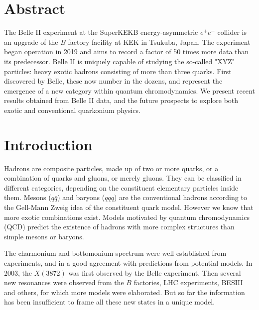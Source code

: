 \documentclass[border=2mm]{article}
\begin{document}
\section*{Abstract}
The Belle II experiment at the SuperKEKB energy-asymmetric $e^{+}e^{-}$ collider is an upgrade of the $B$ factory facility at KEK in Tsukuba, Japan. The experiment began operation in 2019  and aims to record a factor of 50 times more data than its predecessor. Belle II is uniquely capable of studying the so-called "XYZ" particles: heavy exotic hadrons consisting of more
than three quarks. First discovered by Belle, these now number in the dozens, and represent the emergence of a new category within quantum chromodynamics. We present recent results
obtained from Belle II data, and the future prospects to explore both exotic and conventional quarkonium physics.
  



\section{Introduction}
\label{sec:intro}
Hadrons are composite particles, made up of two or more quarks, or a combination of quarks and gluons, or merely gluons. They can be classified in different categories, depending on the constituent elementary particles inside them. Mesons ($q\bar{q}$) and baryons ($qqq$) are the conventional hadrons according to the Gell-Mann Zweig idea of the constituent quark model.
However we know that more exotic combinations exist. Models motivated by quantum chromodynamics (QCD) predict  the existence of hadrons with more complex structures than simple  mesons or baryons.

The charmonium and bottomonium spectrum were well established from experiments, and in a good agreement with predictions from potential models. In 2003, the $X(3872)$ \cite{ref:x3872belle}
was first observed by the Belle experiment. Then several new resonances were observed from the $B$ factories, LHC experiments, BESIII  and others, for which more models were elaborated.
But so far the information has been insufficient to frame all these new states in a unique model.
\end{document}
